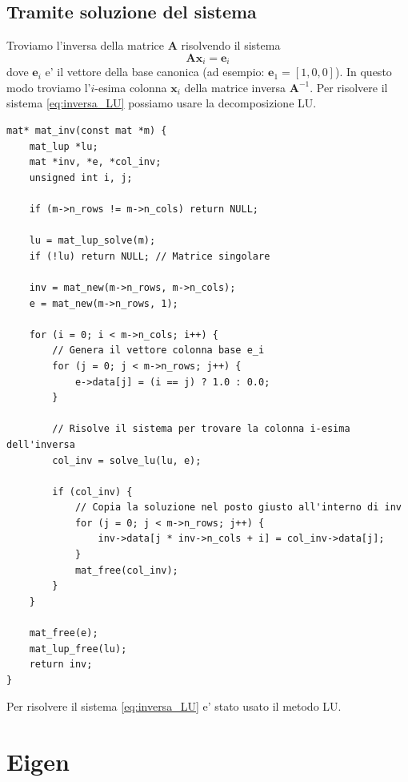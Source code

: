 \documentclass[10pt]{article}
\begin{document}
\subsection{Tramite soluzione del sistema}

Troviamo l'inversa della matrice $\mathbf{A}$ risolvendo il sistema
\begin{equation}
\mathbf{A} \mathbf{x}_i = \mathbf{e}_i
\label{eq:inversa_LU}
\end{equation}
dove $\mathbf{e}_i$ e' il vettore della base canonica (ad esempio: $\mathbf{e}_1 = [1,0,0]$).
In questo modo troviamo l'$i$-esima colonna $\mathbf{x}_i$ della matrice inversa $\mathbf{A}^{-1}$.
Per risolvere il sistema \eqref{eq:inversa_LU} possiamo usare la decomposizione LU.
\begin{lstlisting}
mat* mat_inv(const mat *m) {
    mat_lup *lu;
    mat *inv, *e, *col_inv;
    unsigned int i, j;
    
    if (m->n_rows != m->n_cols) return NULL;
    
    lu = mat_lup_solve(m);
    if (!lu) return NULL; // Matrice singolare
    
    inv = mat_new(m->n_rows, m->n_cols);
    e = mat_new(m->n_rows, 1);
    
    for (i = 0; i < m->n_cols; i++) {
        // Genera il vettore colonna base e_i
        for (j = 0; j < m->n_rows; j++) {
            e->data[j] = (i == j) ? 1.0 : 0.0;
        }
        
        // Risolve il sistema per trovare la colonna i-esima dell'inversa
        col_inv = solve_lu(lu, e);
        
        if (col_inv) {
            // Copia la soluzione nel posto giusto all'interno di inv
            for (j = 0; j < m->n_rows; j++) {
                inv->data[j * inv->n_cols + i] = col_inv->data[j];
            }
            mat_free(col_inv);
        }
    }
    
    mat_free(e);
    mat_lup_free(lu);
    return inv;
}
\end{lstlisting}
Per risolvere il sistema \eqref{eq:inversa_LU} e' stato usato il metodo LU.









\section{Eigen}
\end{document}
